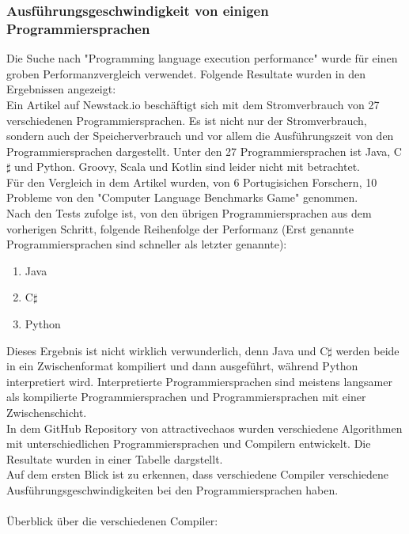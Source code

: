 \documentclass[ngerman]{article}
\begin{document}
    \subsubsection{Ausführungsgeschwindigkeit von einigen Programmiersprachen}
    \label{GrundlagenExecutionPerformance}
    Die Suche nach "Programming language execution performance" wurde für einen groben Performanzvergleich verwendet. Folgende Resultate wurden in den Ergebnissen angezeigt:\\
    Ein Artikel auf Newstack.io beschäftigt sich mit dem Stromverbrauch von 27 verschiedenen Programmiersprachen. Es ist nicht nur der Stromverbrauch, sondern auch der Speicherverbrauch und vor allem die Ausführungszeit von den Programmiersprachen dargestellt. Unter den 27 Programmiersprachen ist Java, C$\sharp$ und Python. Groovy, Scala und Kotlin sind leider nicht mit betrachtet.\\
    Für den Vergleich in dem Artikel wurden, von 6 Portugisichen Forschern, 10 Probleme von den "Computer Language Benchmarks Game" \cite{Computer Language Benchmarks Game} genommen.\\
    Nach den Tests zufolge ist, von den übrigen Programmiersprachen aus dem vorherigen Schritt, folgende Reihenfolge der Performanz (Erst genannte Programmiersprachen sind schneller als letzter genannte):\\
    \begin{enumerate}
        \item Java
        \item C$\sharp$
        \item Python
    \end{enumerate}
    \cite{PowerUseage}
    Dieses Ergebnis ist nicht wirklich verwunderlich, denn Java und C$\sharp$ werden beide in ein Zwischenformat kompiliert und dann ausgeführt, während Python interpretiert wird. Interpretierte Programmiersprachen sind meistens langsamer als kompilierte Programmiersprachen und Programmiersprachen mit einer Zwischenschicht.\\
    In dem GitHub Repository von attractivechaos wurden verschiedene Algorithmen mit unterschiedlichen Programmiersprachen und Compilern entwickelt. Die Resultate wurden in einer Tabelle dargstellt. \cite{ExecutionPerformance}\\
    Auf dem ersten Blick ist zu erkennen, dass verschiedene Compiler verschiedene Ausführungsgeschwindigkeiten bei den Programmiersprachen haben.\\\\
    Überblick über die verschiedenen Compiler:\\
\end{document}
